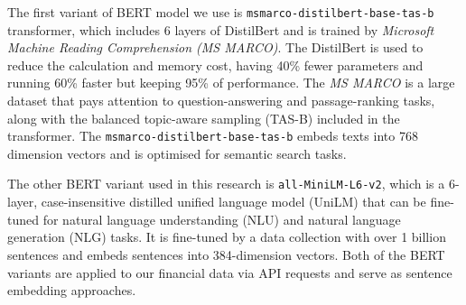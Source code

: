 The first variant of BERT model we use is \texttt{msmarco-distilbert-base-tas-b} transformer, which includes 6 layers of DistilBert and is trained by \textit{Microsoft Machine Reading Comprehension (MS MARCO)}.
The DistilBert\cite{Hofstaetter2021_tasb_dense_retrieval} is used to reduce the calculation and memory cost, having 40\% fewer parameters and running 60\% faster but keeping 95\% of performance.
The \textit{MS MARCO} is a large dataset that pays attention to question-answering and passage-ranking tasks, along with the balanced topic-aware sampling (TAS-B) included in the transformer.
The \texttt{msmarco-distilbert-base-tas-b} embeds texts into 768 dimension vectors and is optimised for semantic search tasks.

The other BERT variant used in this research is \texttt{all-MiniLM-L6-v2}, which is a 6-layer, case-insensitive distilled unified language model (UniLM)\cite{bao2020unilmv2} that can be fine-tuned for natural language understanding (NLU) and natural language generation (NLG) tasks.
It is fine-tuned by a data collection with over 1 billion sentences and embeds sentences into 384-dimension vectors.
Both of the BERT variants are applied to our financial data via API requests and serve as sentence embedding approaches.
